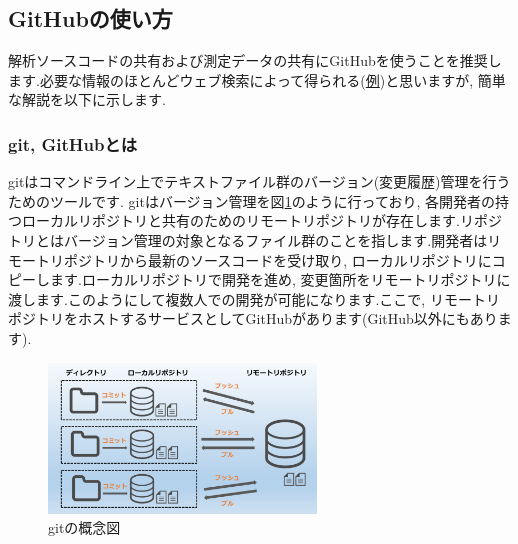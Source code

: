 \subsection{GitHubの使い方}
解析ソースコードの共有および測定データの共有にGitHubを使うことを推奨します.必要な情報のほとんどウェブ検索によって得られる(\href{https://tech-blog.rakus.co.jp/entry/20200529/git}{例})と思いますが, 簡単な解説を以下に示します.

\subsubsection{git, GitHubとは}
gitはコマンドライン上でテキストファイル群のバージョン(変更履歴)管理を行うためのツールです.
gitはバージョン管理を図\ref{fig:git_desc}のように行っており, 各開発者の持つローカルリポジトリと共有のためのリモートリポジトリが存在します\cite{github}.リポジトリとはバージョン管理の対象となるファイル群のことを指します.開発者はリモートリポジトリから最新のソースコードを受け取り, ローカルリポジトリにコピーします.ローカルリポジトリで開発を進め, 変更箇所をリモートリポジトリに渡します.このようにして複数人での開発が可能になります.ここで, リモートリポジトリをホストするサービスとしてGitHubがあります(GitHub以外にもあります).
\begin{figure}
    \centering
    \includegraphics[height=4cm]{../git_desc.png}
    \caption{gitの概念図\cite{github}}
    \label{fig:git_desc}
\end{figure}

